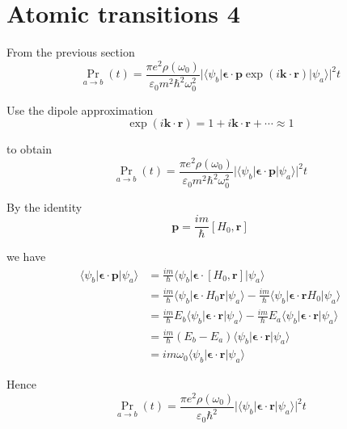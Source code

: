 

\section*{Atomic transitions 4}

From the previous section
\begin{equation*}
\Pr_{a\rightarrow b}(t)
=\frac{\pi e^2\rho(\omega_0)}{\varepsilon_0m^2\hbar^2\omega_0^2}
\bigl|\langle\psi_b|\boldsymbol{\epsilon}\cdot\mathbf p\exp(i\mathbf k\cdot\mathbf r)|\psi_a\rangle\bigr|^2
t
\end{equation*}

Use the dipole approximation
\begin{equation*}
\exp(i\mathbf k\cdot\mathbf r)=1+i\mathbf k\cdot\mathbf r+\cdots\approx1
\end{equation*}

to obtain
\begin{equation*}
\Pr_{a\rightarrow b}(t)
=\frac{\pi e^2\rho(\omega_0)}{\varepsilon_0m^2\hbar^2\omega_0^2}
\bigl|\langle\psi_b|\boldsymbol{\epsilon}\cdot\mathbf p|\psi_a\rangle\bigr|^2
t
\end{equation*}

By the identity
\begin{equation*}
\mathbf p=\frac{im}{\hbar}[H_0,\mathbf r]
\tag{1}
\end{equation*}

we have
\begin{align*}
\langle\psi_b|\boldsymbol{\epsilon}\cdot\mathbf p|\psi_a\rangle
&=\frac{im}{\hbar}\langle\psi_b|\boldsymbol{\epsilon}\cdot[H_0,\mathbf r]|\psi_a\rangle
\\
&=\frac{im}{\hbar}\langle\psi_b|\boldsymbol{\epsilon}\cdot H_0\mathbf r|\psi_a\rangle
-\frac{im}{\hbar}\langle\psi_b|\boldsymbol{\epsilon}\cdot\mathbf rH_0|\psi_a\rangle
\\
&=\frac{im}{\hbar}E_b\langle\psi_b|\boldsymbol{\epsilon}\cdot\mathbf r|\psi_a\rangle
-\frac{im}{\hbar}E_a\langle\psi_b|\boldsymbol{\epsilon}\cdot\mathbf r|\psi_a\rangle
\\
&=\frac{im}{\hbar}(E_b-E_a)\langle\psi_b|\boldsymbol{\epsilon}\cdot\mathbf r|\psi_a\rangle
\\
&=im\omega_0\langle\psi_b|\boldsymbol{\epsilon}\cdot\mathbf r|\psi_a\rangle
\end{align*}

Hence
\begin{equation*}
\Pr_{a\rightarrow b}(t)
=\frac{\pi e^2\rho(\omega_0)}{\varepsilon_0\hbar^2}
\bigl|\langle\psi_b|\boldsymbol{\epsilon}\cdot\mathbf r|\psi_a\rangle\bigr|^2
t
\end{equation*}

